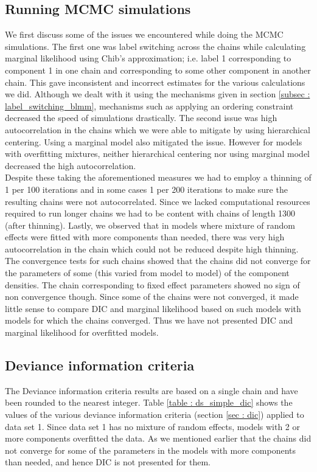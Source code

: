 \subsection{Running MCMC simulations}
We first discuss some of the issues we encountered while doing the MCMC simulations. The first one was label switching across the chains while calculating marginal likelihood using Chib's approximation; i.e. label 1 corresponding to component 1 in one chain and corresponding to some other component in another chain. This gave inconsistent and incorrect estimates for the various calculations we did. Although we dealt with it using the mechanisms given in section \ref{subsec : label_switching_blmm}, mechanisms such as applying an ordering constraint decreased the speed of simulations drastically. The second issue was high autocorrelation in the chains which we were able to mitigate by using hierarchical centering. Using a marginal model also mitigated the issue. However for models with overfitting mixtures, neither hierarchical centering nor using marginal model decreased the high autocorrelation.\\

Despite these taking the aforementioned measures we had to employ a thinning of 1 per 100 iterations and in some cases 1 per 200 iterations to make sure the resulting chains were not autocorrelated. Since we lacked computational resources required to run longer chains we had to be content with chains of length 1300 (after thinning). Lastly, we observed that in models where mixture of random effects were fitted with more components than needed, there was very high autocorrelation in the chain which could not be reduced despite high thinning. The convergence tests for such chains showed that the chains did not converge for the parameters of some (this varied from model to model) of the component densities. The chain corresponding to fixed effect parameters showed no sign of non convergence though. Since some of the chains were not converged, it made little sense to compare DIC and marginal likelihood based on such models with models for which the chains converged. Thus we have not presented DIC and marginal likelihood for overfitted models.

\subsection{Deviance information criteria}
\label{subsec : dic_simulation_results}
The Deviance information criteria results are based on a single chain and have been rounded to the nearest integer. Table \ref{table : ds_simple_dic} shows the values of the various deviance information criteria (section \ref{sec : dic}) applied to data set 1. Since data set 1 has no mixture of random effects, models with 2 or more components overfitted the data. As we mentioned earlier that the chains did not converge for some of the parameters in the models with more components than needed, and hence DIC is not presented for them.\\

